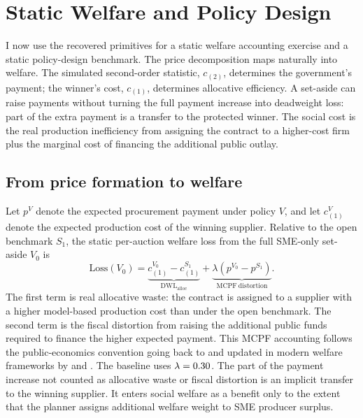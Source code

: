 \section{Static Welfare and Policy Design}\label{sec:welfare_policy}

I now use the recovered primitives for a static welfare accounting exercise
and a static policy-design benchmark. The price decomposition maps naturally
into welfare. The simulated second-order statistic, $c_{(2)}$, determines
the government's payment; the winner's cost, $c_{(1)}$, determines
allocative efficiency. A set-aside can raise payments without turning the
full payment increase into deadweight loss: part of the extra payment is a
transfer to the protected winner. The social cost is the real production
inefficiency from assigning the contract to a higher-cost firm plus the
marginal cost of financing the additional public outlay.

\subsection{From price formation to welfare}

Let $p^V$ denote the expected procurement payment under policy $V$, and let
$c_{(1)}^V$ denote the expected production cost of the winning supplier.
Relative to the open benchmark $S_1$, the static per-auction welfare loss
from the full SME-only set-aside $V_0$ is
\begin{equation}
    \mathrm{Loss}(V_0)
    =
    \underbrace{c_{(1)}^{V_0} - c_{(1)}^{S_1}}_{
        \mathrm{DWL}_{\mathrm{alloc}}}
    +
    \underbrace{\lambda\left(p^{V_0} - p^{S_1}\right)}_{
        \mathrm{MCPF\ distortion}} .
    \label{eq:welfare_v8}
\end{equation}
The first term is real allocative waste: the contract is assigned to a
supplier with a higher model-based production cost than under the open
benchmark. The second term is the fiscal distortion from raising the
additional public funds required to finance the higher expected payment.
This MCPF accounting follows the public-economics convention going back
to \citet{ballard1985} and updated in modern welfare frameworks by
\citet{hendren2020} and \citet{finkelstein2020}. The baseline uses
$\lambda=0.30$. The part of the payment increase not counted as
allocative waste or fiscal distortion is an implicit transfer to the
winning supplier. It enters social welfare as a benefit only to the
extent that the planner assigns additional welfare weight to SME
producer surplus.

